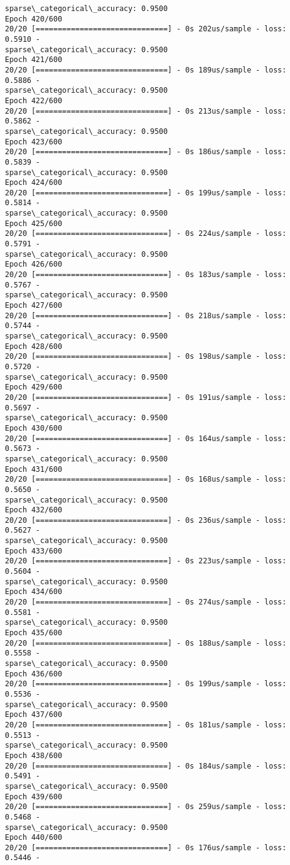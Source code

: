 \documentclass[11pt]{article}
\begin{document}
\begin{Verbatim}[commandchars=\\\{\}]
sparse\_categorical\_accuracy: 0.9500
Epoch 420/600
20/20 [==============================] - 0s 202us/sample - loss: 0.5910 -
sparse\_categorical\_accuracy: 0.9500
Epoch 421/600
20/20 [==============================] - 0s 189us/sample - loss: 0.5886 -
sparse\_categorical\_accuracy: 0.9500
Epoch 422/600
20/20 [==============================] - 0s 213us/sample - loss: 0.5862 -
sparse\_categorical\_accuracy: 0.9500
Epoch 423/600
20/20 [==============================] - 0s 186us/sample - loss: 0.5839 -
sparse\_categorical\_accuracy: 0.9500
Epoch 424/600
20/20 [==============================] - 0s 199us/sample - loss: 0.5814 -
sparse\_categorical\_accuracy: 0.9500
Epoch 425/600
20/20 [==============================] - 0s 224us/sample - loss: 0.5791 -
sparse\_categorical\_accuracy: 0.9500
Epoch 426/600
20/20 [==============================] - 0s 183us/sample - loss: 0.5767 -
sparse\_categorical\_accuracy: 0.9500
Epoch 427/600
20/20 [==============================] - 0s 218us/sample - loss: 0.5744 -
sparse\_categorical\_accuracy: 0.9500
Epoch 428/600
20/20 [==============================] - 0s 198us/sample - loss: 0.5720 -
sparse\_categorical\_accuracy: 0.9500
Epoch 429/600
20/20 [==============================] - 0s 191us/sample - loss: 0.5697 -
sparse\_categorical\_accuracy: 0.9500
Epoch 430/600
20/20 [==============================] - 0s 164us/sample - loss: 0.5673 -
sparse\_categorical\_accuracy: 0.9500
Epoch 431/600
20/20 [==============================] - 0s 168us/sample - loss: 0.5650 -
sparse\_categorical\_accuracy: 0.9500
Epoch 432/600
20/20 [==============================] - 0s 236us/sample - loss: 0.5627 -
sparse\_categorical\_accuracy: 0.9500
Epoch 433/600
20/20 [==============================] - 0s 223us/sample - loss: 0.5604 -
sparse\_categorical\_accuracy: 0.9500
Epoch 434/600
20/20 [==============================] - 0s 274us/sample - loss: 0.5581 -
sparse\_categorical\_accuracy: 0.9500
Epoch 435/600
20/20 [==============================] - 0s 188us/sample - loss: 0.5558 -
sparse\_categorical\_accuracy: 0.9500
Epoch 436/600
20/20 [==============================] - 0s 199us/sample - loss: 0.5536 -
sparse\_categorical\_accuracy: 0.9500
Epoch 437/600
20/20 [==============================] - 0s 181us/sample - loss: 0.5513 -
sparse\_categorical\_accuracy: 0.9500
Epoch 438/600
20/20 [==============================] - 0s 184us/sample - loss: 0.5491 -
sparse\_categorical\_accuracy: 0.9500
Epoch 439/600
20/20 [==============================] - 0s 259us/sample - loss: 0.5468 -
sparse\_categorical\_accuracy: 0.9500
Epoch 440/600
20/20 [==============================] - 0s 176us/sample - loss: 0.5446 -

\end{Verbatim}
\end{document}
